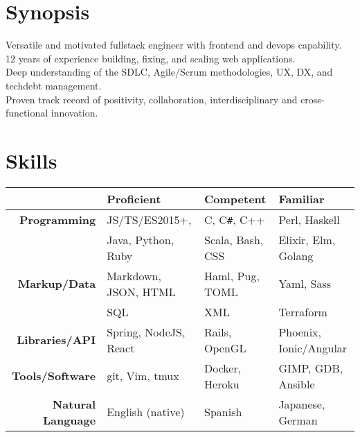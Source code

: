 \documentclass[line,margin]{res}
\newcommand{\CS}{C\texttt{\#}}
\begin{document}
\begin{resume}


\section{\sc Synopsis}
Versatile and motivated fullstack engineer with frontend and devops capability. \\
12 years of experience building, fixing, and scaling web applications. \\
Deep understanding of the SDLC, Agile/Scrum methodologies, UX, DX, and techdebt management. \\
Proven track record of positivity, collaboration, interdisciplinary and cross-functional innovation.



\section{\sc Skills}
    \begin{tabular}{@{\extracolsep{\fill} }r|lll}
      \textsl{} & \textbf{Proficient} & \textbf{Competent} & \textbf{Familiar} \\
      \hline
      \textbf{Programming}            & JS/TS/ES2015+,          & C, \CS, C++         & Perl, Haskell \\
                                      & Java, Python, Ruby      & Scala, Bash, CSS    & Elixir, Elm, Golang \\
      \textbf{Markup/Data}            & Markdown, JSON, HTML    & Haml, Pug, TOML     & Yaml, Sass \\
                                      & SQL                     & XML                 & Terraform \\
      \textbf{Libraries/API}          & Spring, NodeJS, React   & Rails, OpenGL       & Phoenix, Ionic/Angular \\
      \textbf{Tools/Software}         & git, Vim, tmux          & Docker, Heroku      & GIMP, GDB, Ansible \\
      \textbf{Natural Language}       & English (native)        & Spanish             & Japanese, German
    \end{tabular}


\end{resume}
\end{document}

